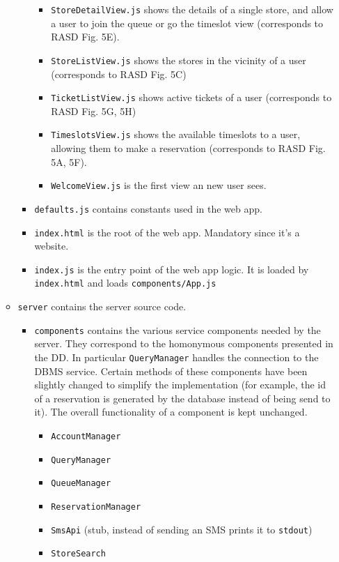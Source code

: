 \documentclass[
]{article}
\begin{document}
\begin{itemize}
\begin{itemize}
\begin{itemize}
\begin{itemize}
        \item \texttt{StoreDetailView.js} shows the details of a single store, and allow a user to join the queue or go the timeslot view (corresponds to RASD Fig. 5E).
        \item \texttt{StoreListView.js} shows the stores in the vicinity of a user (corresponds to RASD Fig. 5C)
        \item \texttt{TicketListView.js} shows active tickets of a user (corresponds to RASD Fig. 5G, 5H)
        \item \texttt{TimeslotsView.js} shows the available timeslots to a user, allowing them to make a reservation (corresponds to RASD Fig. 5A, 5F).
        \item \texttt{WelcomeView.js} is the first view an new user sees.
      \end{itemize}
      \item \texttt{defaults.js} contains constants used in the web app.
      \item \texttt{index.html} is the root of the web app. Mandatory since it's a website.
      \item \texttt{index.js} is the entry point of the web app logic. It is loaded by \texttt{index.html} and loads \texttt{components/App.js}
    \end{itemize}
    \item \texttt{server} contains the server source code.
    \begin{itemize}
      \item \texttt{components} contains the various service components needed by the server. They correspond to the homonymous components presented in the DD. In particular \texttt{QueryManager} handles the connection to the DBMS service. Certain methods of these components have been slightly changed to simplify the implementation (for example, the id of a reservation is generated by the database instead of being send to it). The overall functionality of a component is kept unchanged.
      \begin{itemize}
        \item \texttt{AccountManager}
        \item \texttt{QueryManager}
        \item \texttt{QueueManager}
        \item \texttt{ReservationManager}
        \item \texttt{SmsApi} (stub, instead of sending an SMS prints it to \texttt{stdout})
        \item \texttt{StoreSearch}

\end{itemize}
\end{itemize}
\end{itemize}
\end{itemize}
\end{document}
